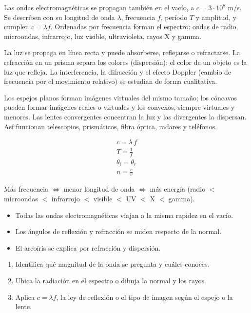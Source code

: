 \documentclass[10pt,a4paper,twocolumn]{article}
\begin{document}
Las ondas electromagnéticas se propagan también en el vacío, a $c=3\cdot 10^8$ m/s. Se describen con su longitud de onda $\lambda$, frecuencia $f$, período $T$ y amplitud, y cumplen $c=\lambda f$. Ordenadas por frecuencia forman el espectro: ondas de radio, microondas, infrarrojo, luz visible, ultravioleta, rayos X y gamma.

La luz se propaga en línea recta y puede absorberse, reflejarse o refractarse. La refracción en un prisma separa los colores (dispersión); el color de un objeto es la luz que refleja. La interferencia, la difracción y el efecto Doppler (cambio de frecuencia por el movimiento relativo) se estudian de forma cualitativa.

Los espejos planos forman imágenes virtuales del mismo tamaño; los cóncavos pueden formar imágenes reales o virtuales y los convexos, siempre virtuales y menores. Las lentes convergentes concentran la luz y las divergentes la dispersan. Así funcionan telescopios, prismáticos, fibra óptica, radares y teléfonos.

\begin{ley}[Relaciones]
\begin{gather*}
c=\lambda\,f \\
T=\frac{1}{f} \\
\theta_i=\theta_r \\
n=\frac{c}{v}
\end{gather*}

Más frecuencia $\Leftrightarrow$ menor longitud de onda $\Leftrightarrow$ más energía (radio $<$ microondas $<$ infrarrojo $<$ visible $<$ UV $<$ X $<$ gamma).
\end{ley}

\begin{ideasclave}
\begin{itemize}
  \item Todas las ondas electromagnéticas viajan a la misma rapidez en el vacío.
  \item Los ángulos de reflexión y refracción se miden respecto de la normal.
  \item El arcoíris se explica por refracción y dispersión.
\end{itemize}
\end{ideasclave}

\begin{metodo}
\begin{enumerate}
  \item Identifica qué magnitud de la onda se pregunta y cuáles conoces.
  \item Ubica la radiación en el espectro o dibuja la normal y los rayos.
  \item Aplica $c=\lambda f$, la ley de reflexión o el tipo de imagen según el espejo o la lente.
\end{enumerate}
\end{metodo}
\end{document}
